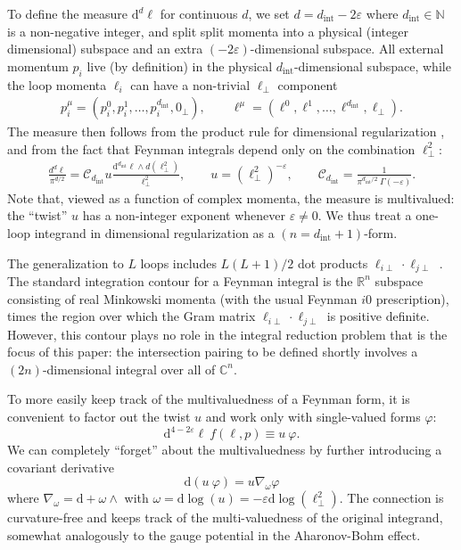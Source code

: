 \documentclass[11pt]{article}
\renewcommand{\d}{\text{d}}
\newcommand{\be}{\begin{equation}}
\newcommand{\ee}{\end{equation}}
\newcommand{\dint}{d_\text{int}}
\newcommand{\C}{\mathcal{C}}
\newcommand{\vphi}{\varphi}
\newcommand{\vep}{\varepsilon}
\newcommand{\eps}{\varepsilon}
\begin{document}
To define the measure $\d^d\ell$ for continuous $d$, we set $d=\dint{-}2\vep$ where $\dint \in \mathbb{N}$ is a non-negative integer, and split
split momenta into a physical (integer dimensional) subspace and an extra $(-2\vep)$-dimensional subspace. All external momentum $p_i$ live (by definition)
in the physical $\dint$-dimensional subspace, while the loop momenta $\ell_i$ can have a non-trivial $\ell_\perp$ component
\begin{align}
	p^\mu_i = (p_i^0, p_i^1, \dots, p_i^{\dint}, 0_\perp), 
	\qquad 
	\ell^\mu = (\ell^0, \ell^1, \dots, \ell^{\dint},\ell_{\perp}).
\end{align}
The measure then follows from the product rule for dimensional regularization \cite{THOOFT1972189}, and from the fact that
Feynman integrals depend only on the combination $\ell_\perp^2$:
\begin{align} \label{eq:one-loop measure}
  \boxed{	
\frac{d^d\ell}{\pi^{d/2}}
		= \C_{\dint} u \frac{\d^{\dint}\ell \wedge d(\ell_\perp^2)}{\ell_\perp^2},
	\qquad 
	u = (\ell_\perp^2)^{-\vep},
	\qquad 
	\C_{\dint} =  \frac{1}{\pi^{\dint/2}\ \Gamma(-\vep)}.
	}
\end{align}
Note that, viewed as a function of complex momenta,
the measure is multivalued: the ``twist'' $u$ has a non-integer exponent whenever $\vep\neq0$. 
We thus treat a one-loop integrand in dimensional regularization as a $(n=\dint{+}1)$-form.

The generalization to $L$ loops includes $L(L+1)/2$ dot products $\ell_{i\perp}{\cdot}\ell_{j\perp}$ \cite{Caron-Huot:2021xqj}.
The standard integration contour for a Feynman integral is the $\mathbb{R}^{n}$ subspace consisting of real Minkowski momenta (with the usual Feynman $i0$ prescription), times the region over which the Gram matrix $\ell_{i\perp}{\cdot}\ell_{j\perp}$ is positive definite.
However, this contour plays no role in the integral reduction problem that is the focus of this paper:
the intersection pairing to be defined shortly involves a $(2n)$-dimensional integral over all of $\mathbb{C}^n$.

To more easily keep track of the multivaluedness of a Feynman form, it is convenient to factor out the twist $u$ and work only with single-valued forms $\vphi$:   
\be
 \d^{4-2\eps}\ell\ f(\ell,p) \equiv u\ \vphi.
\ee
We can completely ``forget'' about the multivaluedness by further introducing a covariant derivative
\be
	\d( u\ \vphi ) = u \nabla_{\omega} \vphi 
\ee
where $\nabla_\omega = \d +\omega \wedge$ with $\omega = \d\log(u)=-\vep \d\log(\ell_\perp^2)$. The connection is
curvature-free and keeps track of the multi-valuedness of the original integrand, somewhat analogously to the gauge potential in the Aharonov-Bohm effect.
\end{document}
